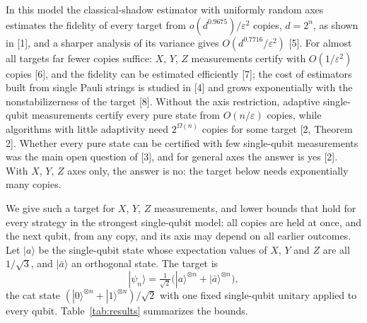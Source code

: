 \documentclass[11pt]{article}
\theoremstyle{remark}
\newcommand{\eps}{\varepsilon}
\newcommand{\ket}[1]{|#1\rangle}
\newcommand{\abar}{\bar a}
\begin{document}
In this model the classical-shadow estimator with uniformly random axes estimates the fidelity of every target from $o(d^{0.9675})/\eps^2$ copies, $d = 2^n$, as shown in [1], and a sharper analysis of its variance gives $O(d^{0.7716}/\eps^2)$ [5]. For almost all targets far fewer copies suffice: $X$, $Y$, $Z$ measurements certify with $O(1/\eps^2)$ copies [6], and the fidelity can be estimated efficiently [7]; the cost of estimators built from single Pauli strings is studied in [4] and grows exponentially with the nonstabilizerness of the target [8]. Without the axis restriction, adaptive single-qubit measurements certify every pure state from $O(n/\eps)$ copies, while algorithms with little adaptivity need $2^{\Omega(n)}$ copies for some target [2, Theorem 2]. Whether every pure state can be certified with few single-qubit measurements was the main open question of [3], and for general axes the answer is yes [2]. With $X$, $Y$, $Z$ axes only, the answer is no: the target below needs exponentially many copies.

We give such a target for $X$, $Y$, $Z$ measurements, and lower bounds that hold for every strategy in the strongest single-qubit model: all copies are held at once, and the next qubit, from any copy, and its axis may depend on all earlier outcomes. Let $\ket a$ be the single-qubit state whose expectation values of $X$, $Y$ and $Z$ are all $1/\sqrt3$, and $\ket\abar$ an orthogonal state. The target is
\[
\ket{\psi_n} = \tfrac{1}{\sqrt2}\bigl(\ket a^{\otimes n} + \ket\abar^{\otimes n}\bigr),
\]
the cat state $(\ket0^{\otimes n}+\ket1^{\otimes n})/\sqrt2$ with one fixed single-qubit unitary applied to every qubit. Table~\ref{tab:results} summarizes the bounds.
\end{document}
